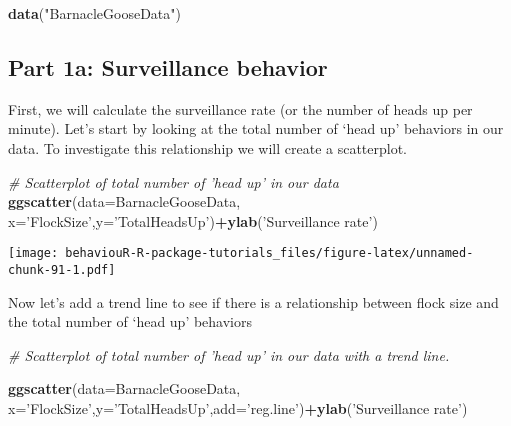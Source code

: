\documentclass[]{book}
\newenvironment{Shaded}{\begin{snugshade}}{\end{snugshade}}
\newcommand{\CommentTok}[1]{\textcolor[rgb]{0.56,0.35,0.01}{\textit{#1}}}
\newcommand{\DataTypeTok}[1]{\textcolor[rgb]{0.13,0.29,0.53}{#1}}
\newcommand{\KeywordTok}[1]{\textcolor[rgb]{0.13,0.29,0.53}{\textbf{#1}}}
\newcommand{\NormalTok}[1]{#1}
\newcommand{\OperatorTok}[1]{\textcolor[rgb]{0.81,0.36,0.00}{\textbf{#1}}}
\newcommand{\StringTok}[1]{\textcolor[rgb]{0.31,0.60,0.02}{#1}}
\begin{document}
\begin{Shaded}
\begin{Highlighting}[]
\KeywordTok{data}\NormalTok{(}\StringTok{"BarnacleGooseData"}\NormalTok{)}
\end{Highlighting}
\end{Shaded}

\hypertarget{part-1a-surveillance-behavior}{%
\subsection*{Part 1a: Surveillance behavior}\label{part-1a-surveillance-behavior}}

First, we will calculate the surveillance rate (or the number of heads up per minute). Let's start by looking at the total number of `head up' behaviors in our data. To investigate this relationship we will create a scatterplot.

\begin{Shaded}
\begin{Highlighting}[]
\CommentTok{# Scatterplot of total number of 'head up' in our data}
\KeywordTok{ggscatter}\NormalTok{(}\DataTypeTok{data=}\NormalTok{BarnacleGooseData,}
          \DataTypeTok{x=}\StringTok{'FlockSize'}\NormalTok{,}\DataTypeTok{y=}\StringTok{'TotalHeadsUp'}\NormalTok{)}\OperatorTok{+}\KeywordTok{ylab}\NormalTok{(}\StringTok{'Surveillance rate'}\NormalTok{)}
\end{Highlighting}
\end{Shaded}

\texttt{[image: behaviouR-R-package-tutorials\_files/figure-latex/unnamed-chunk-91-1.pdf]}

Now let's add a trend line to see if there is a relationship between flock size and the total number of `head up' behaviors

\begin{Shaded}
\begin{Highlighting}[]
\CommentTok{# Scatterplot of total number of 'head up' in our data with a trend line.}

\KeywordTok{ggscatter}\NormalTok{(}\DataTypeTok{data=}\NormalTok{BarnacleGooseData,}
          \DataTypeTok{x=}\StringTok{'FlockSize'}\NormalTok{,}\DataTypeTok{y=}\StringTok{'TotalHeadsUp'}\NormalTok{,}\DataTypeTok{add=}\StringTok{'reg.line'}\NormalTok{)}\OperatorTok{+}\KeywordTok{ylab}\NormalTok{(}\StringTok{'Surveillance rate'}\NormalTok{)}
\end{Highlighting}
\end{Shaded}
\end{document}
